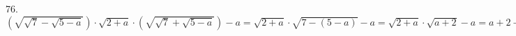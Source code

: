 76. $\left(\sqrt{\sqrt{7}-\sqrt{5-a}}\right)\cdot\sqrt{2+a}\cdot\left(\sqrt{\sqrt{7}+\sqrt{5-a}}\right)-a=
\sqrt{2+a}\cdot\sqrt{7-(5-a)}-a=\sqrt{2+a}\cdot\sqrt{a+2}-a=a+2-a=2.$\\
